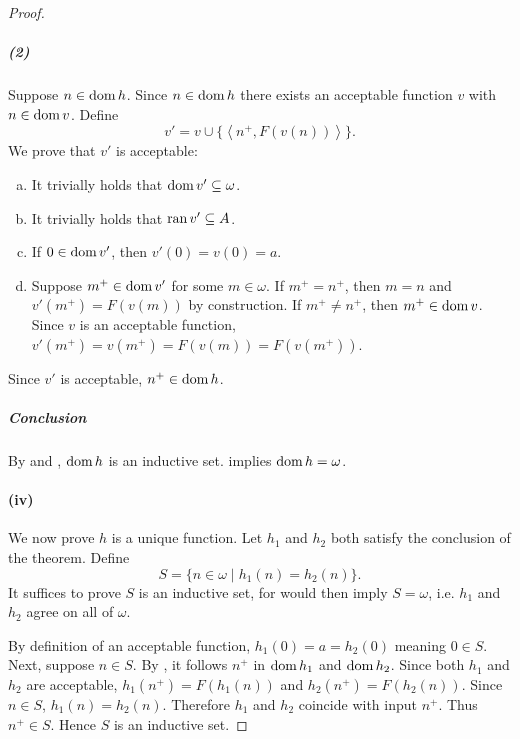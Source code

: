 \documentclass{report}
\newcommand{\pair}[1]{\left< #1 \right>}
\begin{document}
\begin{proof}
    \subparagraph{(2)}%
    \label{spar:recursion-theorem-natural-numbers-iii-2}

      Suppose $n \in \mathop{\text{dom}}{h}$.
      Since $n \in \mathop{\text{dom}}{h}$ there exists an acceptable function $v$ with
        $n \in \mathop{\text{dom}}{v}$.
      Define $$v' = v \cup \{\pair{n^+, F(v(n))}\}.$$
      We prove that $v'$ is acceptable:

      \begin{enumerate}[(a)]
        \item It trivially holds that $\mathop{\text{dom}}{v'} \subseteq \omega$.
        \item It trivially holds that $\mathop{\text{ran}}{v'} \subseteq A$.
        \item If $0 \in \mathop{\text{dom}}{v'}$, then $v'(0) = v(0) = a$.
        \item
          Suppose $m^+ \in \mathop{\text{dom}}{v'}$ for some $m \in \omega$.
          If $m^+ = n^+$, then $m = n$ and $v'(m^+) = F(v(m))$ by construction.
          If $m^+ \neq n^+$, then $m^+ \in \mathop{\text{dom}}{v}$.
          Since $v$ is an acceptable function,
            $v'(m^+) = v(m^+) = F(v(m)) = F(v(m^+))$.
      \end{enumerate}
      Since $v'$ is acceptable, $n^+ \in \mathop{\text{dom}}{h}$.

    \subparagraph{Conclusion}%

      By  and
        ,
        $\mathop{\text{dom}}{h}$ is an inductive set.
       implies $\mathop{\text{dom}}{h} = \omega$.

  \paragraph{(iv)}%
  \label{par:recursion-theorem-natural-numbers-iv}

    We now prove $h$ is a unique function.
    Let $h_1$ and $h_2$ both satisfy the conclusion of the theorem.
    Define $$S = \{n \in \omega \mid h_1(n) = h_2(n)\}.$$
    It suffices to prove $S$ is an inductive set, for 
      would then imply $S = \omega$, i.e. $h_1$ and $h_2$ agree on all of
      $\omega$.

    By definition of an acceptable function, $h_1(0) = a = h_2(0)$ meaning
      $0 \in S$.
    Next, suppose $n \in S$.
    By , it follows $n^+$
      in $\mathop{\text{dom}}{h_1}$ and $\mathop{\text{dom}}{h_2}$.
    Since both $h_1$ and $h_2$ are acceptable, $h_1(n^+) = F(h_1(n))$ and
      $h_2(n^+) = F(h_2(n))$.
    Since $n \in S$, $h_1(n) = h_2(n)$.
    Therefore $h_1$ and $h_2$ coincide with input $n^+$.
    Thus $n^+ \in S$.
    Hence $S$ is an inductive set.


\end{proof}
\end{document}
